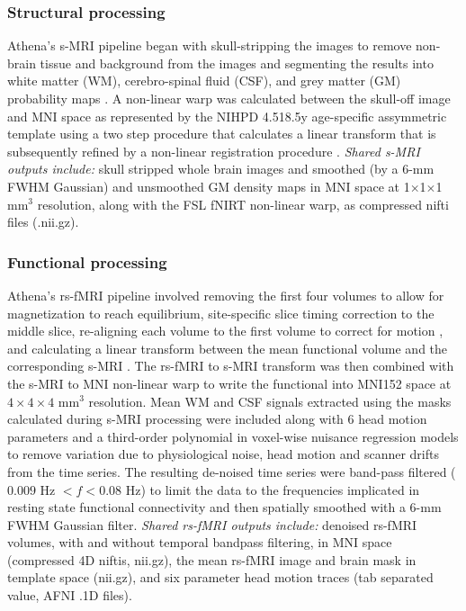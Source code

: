 \documentclass[preprint,12pt,3p]{elsarticle}
\begin{document}
\begin{itemize}
\subsubsection{Structural processing} Athena's s-MRI pipeline began with skull-stripping the images to remove non-brain tissue and background from the images \cite{smith2002_bet} and segmenting the results into white matter (WM), cerebro-spinal fluid (CSF), and grey matter (GM) probability maps \cite{zhang2001_fast}. A non-linear warp was calculated between the skull-off image and MNI space as represented by the NIHPD 4.5\textendash18.5y age-specific assymmetric template \cite{fonov2011unbiased} using a two step procedure that calculates a linear transform \cite{jenkinson2002_flirt} that is subsequently refined by a non-linear registration procedure \cite{andersson2007non}. \emph{Shared s-MRI outputs include:} skull stripped whole brain images and smoothed (by a 6-mm FWHM Gaussian) and unsmoothed GM density maps in MNI space at 1$\times$1$\times$1 mm$^3$ resolution, along with the FSL fNIRT non-linear warp, as compressed nifti files (.nii.gz). 

\subsubsection{Functional processing} Athena's rs-fMRI pipeline involved removing the first four volumes to allow for magnetization to reach equilibrium, site-specific slice timing correction to the middle slice, re-aligning each volume to the first volume to correct for motion \cite{cox1999_motion}, and calculating a linear transform between the mean functional volume and the corresponding s-MRI \cite{jenkinson2002_flirt}. The rs-fMRI to s-MRI transform was then combined with the s-MRI to MNI non-linear warp to write the functional into MNI152 space at $4\times4\times4$ mm$^3$ resolution. Mean WM and CSF signals extracted using the masks calculated during s-MRI processing were included along with 6 head motion parameters and a third-order polynomial in voxel-wise nuisance regression models to remove variation due to physiological noise, head motion and scanner drifts from the time series\cite{lund2006_nvr,fox2005}. The resulting de-noised time series were band-pass filtered ($0.009$ Hz $< f < 0.08$ Hz) to limit the data to the frequencies implicated in resting state functional connectivity \cite{biswal1995,cordes2001} and then spatially smoothed with a 6-mm FWHM Gaussian filter. \emph{Shared rs-fMRI outputs include:} denoised rs-fMRI volumes, with and without temporal bandpass filtering, in MNI space (compressed 4D niftis, nii.gz), the mean rs-fMRI image and brain mask in template space (nii.gz), and six parameter head motion traces (tab separated value, AFNI .1D files). 


\end{itemize}
\end{document}

